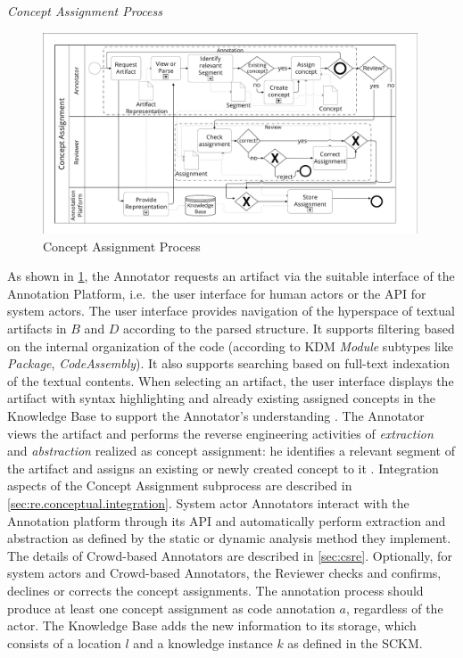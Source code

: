 \emph{Concept Assignment Process}

\begin{figure}
\hypertarget{fig:awsm.re.concept.assignment}{%
\centering
\includegraphics[width=0.99\textwidth]{../figures/awsm-re-concept-assignment.pdf}
\caption{Concept Assignment Process}\label{fig:awsm.re.concept.assignment}
}
\end{figure}

As shown in \cref{fig:awsm.re.concept.assignment}, the Annotator requests an artifact via the suitable interface of the Annotation Platform, i.e.~the user interface for human actors or the API for system actors.
The user interface provides navigation of the hyperspace \autocite{Tilley1996ProgramUnderstanding} of textual artifacts in \(B\) and \(D\) according to the parsed structure.
It supports filtering based on the internal organization of the code (according to KDM \emph{Module} subtypes like \emph{Package}, \emph{CodeAssembly}).
It also supports searching based on full-text indexation of the textual contents.
When selecting an artifact, the user interface displays the artifact with syntax highlighting and already existing assigned concepts in the Knowledge Base to support the Annotator's understanding \autocite[cf.~cognitive factors in][]{Tilley1996ProgramUnderstanding}.
The Annotator views the artifact and performs the reverse engineering activities of \emph{extraction} and \emph{abstraction} \autocite{Tilley1996ProgramUnderstanding} realized as concept assignment: he identifies a relevant segment of the artifact and assigns an existing or newly created concept to it \autocite{Biggerstaff1993ConceptAssignmentICSE}.
Integration aspects of the Concept Assignment subprocess are described in \cref{sec:re.conceptual.integration}.
System actor Annotators interact with the Annotation platform through its API and automatically perform extraction and abstraction as defined by the static or dynamic analysis method they implement.
The details of Crowd-based Annotators are described in \cref{sec:csre}.
Optionally, for system actors and Crowd-based Annotators, the Reviewer checks and confirms, declines or corrects the concept assignments.
The annotation process should produce at least one concept assignment as code annotation \(a\), regardless of the actor.
The Knowledge Base adds the new information to its storage, which consists of a location \(l\) and a knowledge instance \(k\) as defined in the SCKM.

